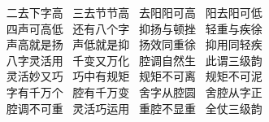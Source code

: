 {\hspace*{50pt}~ 二去下字高~\hspace{40pt} 三去节节高~\hspace{40pt} 去阳阳可高~\hspace{40pt} 阳去阳可低\\
\hspace*{50pt}~ 四声可高低~\hspace{40pt} 还有八个字~\hspace{40pt} 抑扬与顿挫~\hspace{40pt} 轻重与疾徐\\
\hspace*{50pt}~ 声高就是扬~\hspace{40pt} 声低就是抑~\hspace{40pt} 扬效同重徐~\hspace{40pt} 抑用同轻疾\\
\hspace*{50pt}~ 八字灵活用~\hspace{40pt} 千变又万化~\hspace{40pt} 腔调自然生~\hspace{40pt} 此谓三级韵\\
\hspace*{50pt}~ 灵活妙又巧~\hspace{40pt} 巧中有规矩~\hspace{40pt} 规矩不可离~\hspace{40pt} 规矩不可泥\\
\hspace*{50pt}~ 字有千万个~\hspace{40pt} 腔有千万变~\hspace{40pt} 舍字从腔圆~\hspace{40pt} 舍腔从字正\\
\hspace*{50pt}~ 腔调不可重~\hspace{40pt} 灵活巧运用~\hspace{40pt} 重腔不显重~\hspace{40pt} 全仗三级韵}

